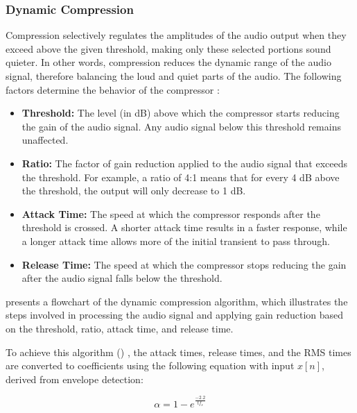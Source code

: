 \subsubsection{Dynamic Compression}
\label{sec:compression}

Compression selectively regulates the amplitudes of the audio output when they
exceed above the given threshold, making only these selected portions sound quieter.
In other words, compression reduces the dynamic range of the audio signal, therefore
balancing the loud and quiet parts of the audio. The following factors determine
the behavior of the compressor \cite{dutilleux_nonlinear2011}:

\begin{itemize}
    \item \textbf{Threshold:} The level (in dB) above which the compressor starts reducing the gain of the audio signal.
    Any audio signal below this threshold remains unaffected.
    \item \textbf{Ratio:} The factor of gain reduction applied to the audio signal that exceeds the threshold.
    For example, a ratio of 4:1 means that for every 4 dB above the threshold, the output will only decrease to 1 dB.
    \item \textbf{Attack Time:} The speed at which the compressor responds after the threshold is crossed. 
    A shorter attack time results in a faster response, while a longer attack time allows more of the initial transient to pass through.
    \item \textbf{Release Time:} The speed at which the compressor stops reducing the gain after the audio signal falls below the threshold.
\end{itemize}

 presents a flowchart of the dynamic compression algorithm, which illustrates
the steps involved in processing the audio signal and applying gain reduction based on the threshold, 
ratio, attack time, and release time.



To achieve this algorithm () \cite{dutilleux_nonlinear2011,anthropicclaude}, 
the attack times, release times, and the RMS times are converted
to coefficients using the following equation with input $x[n]$, derived from envelope detection:

\begin{equation}\label{eq:time_to_coef}
    \alpha = 1 - e^\frac{-2.2}{tf_s}
\end{equation}

